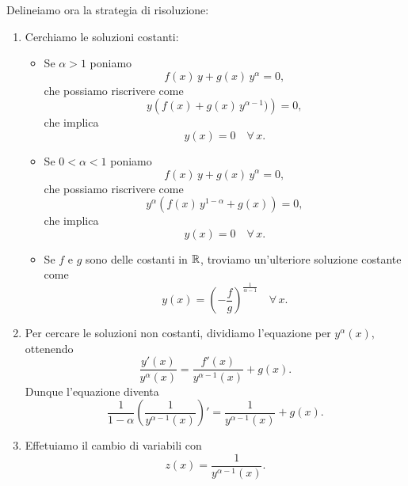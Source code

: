 \documentclass[../../analisi2]{subfiles}
\begin{document}
            Delineiamo ora la strategia di risoluzione:
            \begin{enumerate}
                \item Cerchiamo le soluzioni costanti:
                    \begin{itemize}
                        \item Se \(\alpha > 1\) poniamo
                            \[
                                f(x) \, y + g(x) \, y^\alpha = 0,
                            \]
                            che possiamo riscrivere come
                            \[
                                y \left(f(x) + g(x) \, y^{\alpha - 1})\right) = 0,
                            \]
                            che implica
                            \[
                                y(x) = 0 \quad \forall\,  x.
                            \]
                        \item Se \(0 < \alpha < 1\) poniamo
                            \[
                                f(x) \, y + g(x) \, y^\alpha = 0,
                            \]
                            che possiamo riscrivere come
                            \[
                                y^\alpha \left(f(x) \, y^{1 - \alpha} + g(x)\right) = 0,
                            \]
                            che implica
                            \[
                                y(x) = 0 \quad \forall\,  x.
                            \]
                        \item Se \(f\) e \(g\) sono delle costanti in \(\mathbb{R}\), troviamo un'ulteriore soluzione costante come
                            \[
                                y(x) = \left(-\frac{f}{g}\right)^{\frac{1}{\alpha - 1}} \quad \forall \, x.
                            \]
                    \end{itemize}
                \item Per cercare le soluzioni non costanti, dividiamo l'equazione per \(y^\alpha (x)\), ottenendo
                    \[
                        \frac{y'(x)}{y^\alpha (x)} = \frac{f'(x)}{y^{\alpha - 1} (x)} + g(x).
                    \]
                    Dunque l'equazione diventa
                    \[
                        \frac{1}{1 - \alpha} \left(\frac{1}{y^{\alpha - 1} (x)}\right)' = \frac{1}{y^{\alpha - 1} (x)} + g(x).
                    \]
                \item Effetuiamo il cambio di variabili con
                    \[
                        z(x) = \frac{1}{y^{\alpha - 1} (x)}.
                    \]

\end{enumerate}
\end{document}
